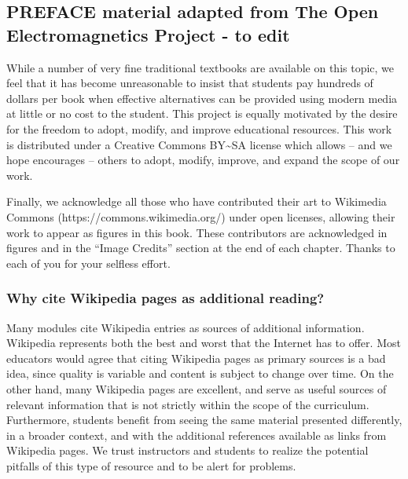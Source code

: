 \hypertarget{preface-material-adapted-from-the-open-electromagnetics-project---to-edit}{%
\subsection{PREFACE material adapted from The Open Electromagnetics
Project - to
edit}\label{preface-material-adapted-from-the-open-electromagnetics-project---to-edit}}

While a number of very fine traditional textbooks are available on this
topic, we feel that it has become unreasonable to insist that students
pay hundreds of dollars per book when effective alternatives can be
provided using modern media at little or no cost to the student. This
project is equally motivated by the desire for the freedom to adopt,
modify, and improve educational resources. This work is distributed
under a Creative Commons BY\textasciitilde{}SA license which allows --
and we hope encourages -- others to adopt, modify, improve, and expand
the scope of our work.

Finally, we acknowledge all those who have contributed their art to
Wikimedia Commons (https://commons.wikimedia.org/) under open licenses,
allowing their work to appear as figures in this book. These
contributors are acknowledged in figures and in the ``Image Credits''
section at the end of each chapter. Thanks to each of you for your
selfless effort.

\hypertarget{why-cite-wikipedia-pages-as-additional-reading}{%
\subsubsection{Why cite Wikipedia pages as additional
reading?}\label{why-cite-wikipedia-pages-as-additional-reading}}

Many modules cite Wikipedia entries as sources of additional
information. Wikipedia represents both the best and worst that the
Internet has to offer. Most educators would agree that citing Wikipedia
pages as primary sources is a bad idea, since quality is variable and
content is subject to change over time. On the other hand, many
Wikipedia pages are excellent, and serve as useful sources of relevant
information that is not strictly within the scope of the curriculum.
Furthermore, students benefit from seeing the same material presented
differently, in a broader context, and with the additional references
available as links from Wikipedia pages. We trust instructors and
students to realize the potential pitfalls of this type of resource and
to be alert for problems.
